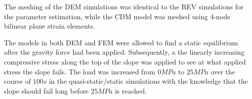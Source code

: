 The meshing of the DEM simulations was identical to the REV simulations for the parameter estimation, while the CDM model was meshed using 4-node bilinear plane strain elements.

The models in both DEM and FEM were allowed to find a static equilibrium after the gravity force had been applied. Subsequently, a the linearly increasing compressive stress along the top of the slope was applied to see at what applied stress the slope fails. The load was increased from $0MPa$ to $25 MPa$ over the course of $100s$ in the quasi-static/static simulations with the knowledge that the slope should fail long before $25MPa$ is reached.